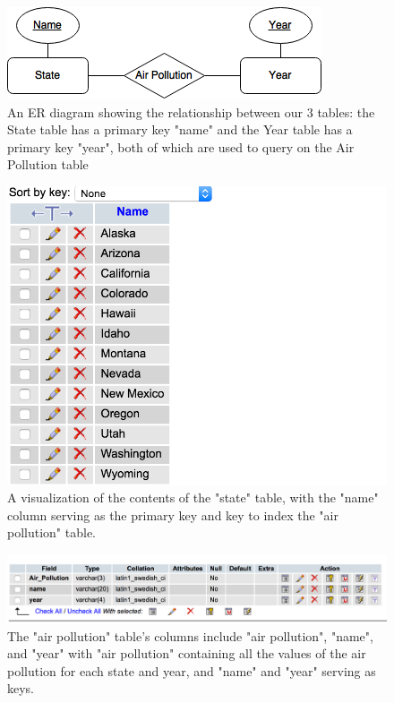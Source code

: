 \documentclass[journal]{vgtc}                %
\begin{document}
\begin{figure}
 \centering %
 \includegraphics[width=\columnwidth]{cs458-ER-diagram-ass1}
 \caption{An ER diagram showing the relationship between our 3 tables: the State table has a primary key "name" and the Year table has a primary key "year", both of which are used to query on the Air Pollution table}
 \label{fig:ERdiagram}
\end{figure}


\begin{figure}
\centering
\includegraphics[width=\columnwidth]{state_db}
\caption{A visualization of the contents of the "state" table, with the "name" column serving as the primary key and key 
to index the "air pollution" table.}
\label{fig:stateDB}
\end{figure}

\begin{figure}
\centering
\includegraphics[width=\columnwidth]{air_poll_db}
\caption{The "air pollution" table's columns include "air pollution", "name", and "year" with "air pollution" 
containing all the values of the air pollution for each state and year, and "name" and "year" serving as keys.}
\label{fig:airPoll}
\end{figure}
\end{document}
